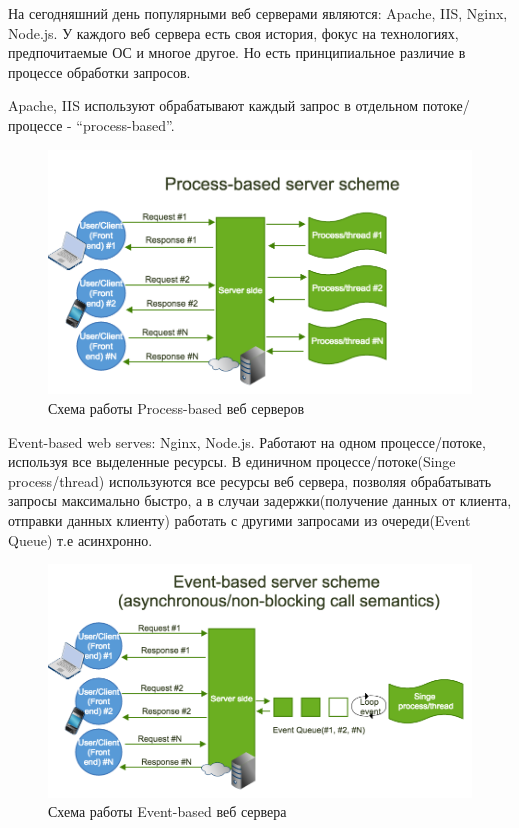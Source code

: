 На сегодняшний день популярными веб серверами являются: Apache, IIS, Nginx,
Node.js. У каждого веб сервера есть своя история, фокус на технологиях,
предпочитаемые ОС и многое другое. Но есть принципиальное различие в процессе
обработки запросов.

Apache, IIS используют обрабатывают каждый запрос в отдельном потоке/процессе -
“process-based”.
\begin{figure}[H]
    \centering
    \includegraphics[scale=0.40]{inc/img/process-based-server.png}
    \caption{Схема работы Process-based веб серверов}
\end{figure}

Event-based web serves: Nginx, Node.js. Работают на одном процессе/потоке,
используя все выделенные ресурсы. В единичном процессе/потоке(Singe
process/thread) используются все ресурсы веб сервера, позволяя обрабатывать
запросы максимально быстро, а в случаи задержки(получение данных от клиента,
отправки данных клиенту) работать с другими запросами из очереди(Event Queue)
т.е асинхронно.
\begin{figure}[H]
    \centering
    \includegraphics[scale=0.40]{inc/img/event-based-server.png}
    \caption{Схема работы Event-based веб сервера}
\end{figure}

